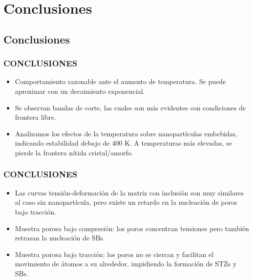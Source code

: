 
\section{Conclusiones}
\subsection{Conclusiones}

\begin{frame}
  \frametitle{CONCLUSIONES}
  \vspace{0.2cm}
 \begin{itemize} 
  \item Comportamiento razonable ante el aumento de temperatura. Se puede aproximar con un decaimiento exponencial.
  \vspace{0.2cm}
  \item Se observan bandas de corte, las cuales son más evidentes con condiciones de frontera libre.
  \vspace{0.2cm}
  \item Analizamos los efectos de la temperatura sobre nanopartículas embebidas, indicando estabilidad debajo de 400 K. A temperaturas más elevadas, se pierde la frontera nítida cristal/amorfo.
 \end{itemize}
\end{frame}

\begin{frame}
  \frametitle{CONCLUSIONES}
  \vspace{0.2cm}
 \begin{itemize}
  \item Las curvas tensión-deformación de la matriz con inclusión son muy similares al caso sin nanopartícula, pero existe un retardo en la nucleación de poros bajo tracción.
  \vspace{0.2cm}
  \item Muestra porosa bajo compresión: los poros concentran tensiones pero también retrasan la nucleación de SBs.
  \vspace{0.2cm}
  \item Muestra porosa bajo tracción: los poros no se cierran y facilitan el movimiento de átomos a su alrededor, impidiendo la formación de STZs y SBs.
 \end{itemize}
\end{frame}

